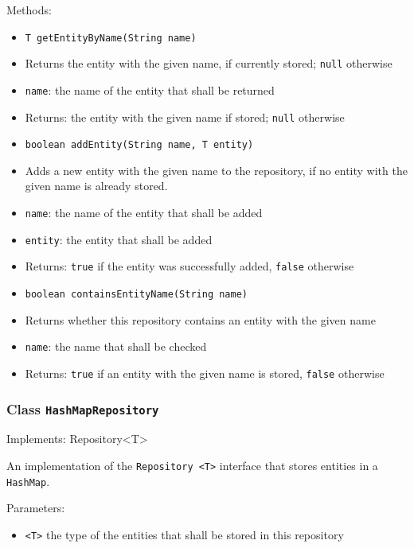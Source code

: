 \documentclass[parskip=full,11pt]{scrartcl}
\begin{document}
Methods:
\begin{itemize}\itemsep -10pt
	\item \texttt{T getEntityByName(String name)}
	\item[] Returns the entity with the given name, if currently stored; \texttt{null} otherwise
	\item[] \texttt{name}: the name of the entity that shall be returned
	\item[] Returns: the entity with the given name if stored; \texttt{null} otherwise
	
	\item \texttt{boolean addEntity(String name, T entity)}
	\item[] Adds a new entity with the given name to the repository, if no entity with the given name is already stored.
	\item[] \texttt{name}: the name of the entity that shall be added
	\item[] \texttt{entity}: the entity that shall be added
	\item[] Returns: \texttt{true} if the entity was successfully added, \texttt{false} otherwise
	
	\item \texttt{boolean containsEntityName(String name)}
	\item[] Returns whether this repository contains an entity with the given name
	\item[] \texttt{name}: the name that shall be checked
	\item[] Returns: \texttt{true} if an entity with the given name is stored, \texttt{false} otherwise
	
\end{itemize}

\subsubsection{Class \texttt{HashMapRepository}}

Implements: Repository<T>
 
An implementation of the \texttt{Repository <T>} interface that stores entities in a \texttt{HashMap}.

Parameters:

\begin{itemize}\itemsep -10pt
	\item \texttt{<T>} the type of the entities that shall be stored in this repository
\end{itemize}
\end{document}
